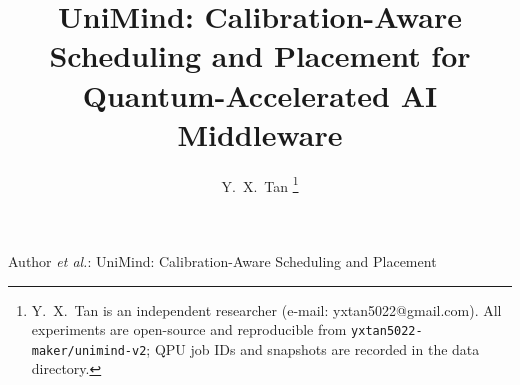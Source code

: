 \documentclass[journal,10pt,twocolumn]{IEEEtran}
\begin{document}
\title{UniMind: Calibration-Aware Scheduling and Placement for Quantum-Accelerated AI Middleware}

\author{Y.~X.~Tan%
\thanks{Y.~X.~Tan is an independent researcher (e-mail: yxtan5022@gmail.com). All experiments are open-source and
reproducible from \texttt{yxtan5022-maker/unimind-v2}; QPU job IDs and snapshots are recorded in the data directory.}}

%
{Author \MakeLowercase{\textit{et al.}}: UniMind: Calibration-Aware Scheduling and Placement}

\maketitle

\end{document}
